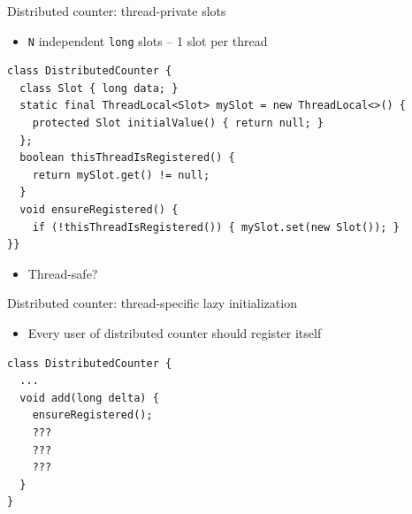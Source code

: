 
\begin{frame}{Distributed counter: thread-private slots}

\begin{itemize}
    \item \texttt{N} independent \texttt{long} slots -- 1 slot per thread    
\end{itemize}

\begin{verbatim}
class DistributedCounter {
  class Slot { long data; }
  static final ThreadLocal<Slot> mySlot = new ThreadLocal<>() {
    protected Slot initialValue() { return null; }
  };
  boolean thisThreadIsRegistered() { 
    return mySlot.get() != null; 
  }
  void ensureRegistered() {
    if (!thisThreadIsRegistered()) { mySlot.set(new Slot()); }
}}
\end{verbatim}

\pause

\begin{itemize}
    \item Thread-safe?
\end{itemize}

\end{frame}


\begin{frame}{Distributed counter: thread-specific lazy initialization}

\begin{itemize}
    \item Every user of distributed counter should register itself
\end{itemize}

\begin{verbatim}
class DistributedCounter {
  ...
  void add(long delta) {
    ensureRegistered();
    ???
    ???
    ???
  }
}
\end{verbatim}
\end{frame}


